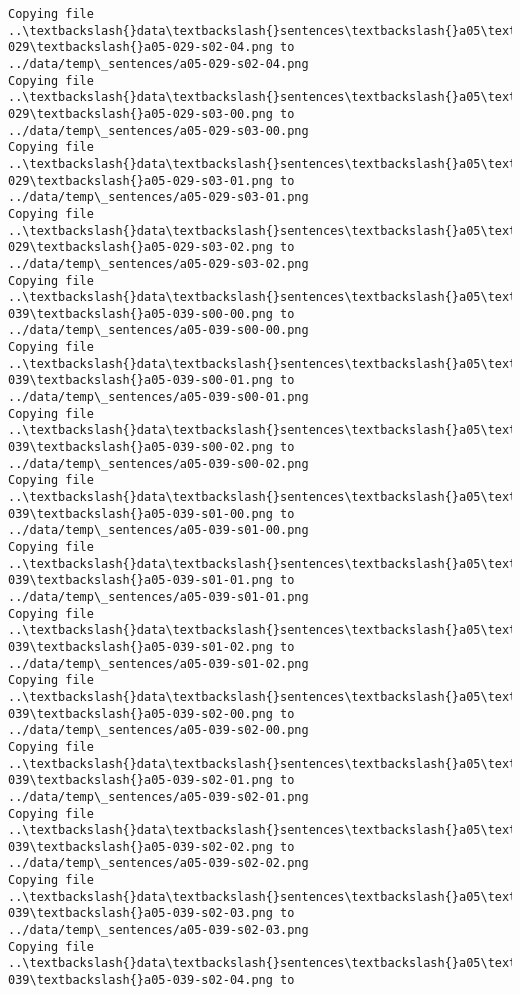\documentclass[11pt]{article}
\begin{document}
\begin{Verbatim}[commandchars=\\\{\}]
Copying file ..\textbackslash{}data\textbackslash{}sentences\textbackslash{}a05\textbackslash{}a05-029\textbackslash{}a05-029-s02-04.png to
../data/temp\_sentences/a05-029-s02-04.png
Copying file ..\textbackslash{}data\textbackslash{}sentences\textbackslash{}a05\textbackslash{}a05-029\textbackslash{}a05-029-s03-00.png to
../data/temp\_sentences/a05-029-s03-00.png
Copying file ..\textbackslash{}data\textbackslash{}sentences\textbackslash{}a05\textbackslash{}a05-029\textbackslash{}a05-029-s03-01.png to
../data/temp\_sentences/a05-029-s03-01.png
Copying file ..\textbackslash{}data\textbackslash{}sentences\textbackslash{}a05\textbackslash{}a05-029\textbackslash{}a05-029-s03-02.png to
../data/temp\_sentences/a05-029-s03-02.png
Copying file ..\textbackslash{}data\textbackslash{}sentences\textbackslash{}a05\textbackslash{}a05-039\textbackslash{}a05-039-s00-00.png to
../data/temp\_sentences/a05-039-s00-00.png
Copying file ..\textbackslash{}data\textbackslash{}sentences\textbackslash{}a05\textbackslash{}a05-039\textbackslash{}a05-039-s00-01.png to
../data/temp\_sentences/a05-039-s00-01.png
Copying file ..\textbackslash{}data\textbackslash{}sentences\textbackslash{}a05\textbackslash{}a05-039\textbackslash{}a05-039-s00-02.png to
../data/temp\_sentences/a05-039-s00-02.png
Copying file ..\textbackslash{}data\textbackslash{}sentences\textbackslash{}a05\textbackslash{}a05-039\textbackslash{}a05-039-s01-00.png to
../data/temp\_sentences/a05-039-s01-00.png
Copying file ..\textbackslash{}data\textbackslash{}sentences\textbackslash{}a05\textbackslash{}a05-039\textbackslash{}a05-039-s01-01.png to
../data/temp\_sentences/a05-039-s01-01.png
Copying file ..\textbackslash{}data\textbackslash{}sentences\textbackslash{}a05\textbackslash{}a05-039\textbackslash{}a05-039-s01-02.png to
../data/temp\_sentences/a05-039-s01-02.png
Copying file ..\textbackslash{}data\textbackslash{}sentences\textbackslash{}a05\textbackslash{}a05-039\textbackslash{}a05-039-s02-00.png to
../data/temp\_sentences/a05-039-s02-00.png
Copying file ..\textbackslash{}data\textbackslash{}sentences\textbackslash{}a05\textbackslash{}a05-039\textbackslash{}a05-039-s02-01.png to
../data/temp\_sentences/a05-039-s02-01.png
Copying file ..\textbackslash{}data\textbackslash{}sentences\textbackslash{}a05\textbackslash{}a05-039\textbackslash{}a05-039-s02-02.png to
../data/temp\_sentences/a05-039-s02-02.png
Copying file ..\textbackslash{}data\textbackslash{}sentences\textbackslash{}a05\textbackslash{}a05-039\textbackslash{}a05-039-s02-03.png to
../data/temp\_sentences/a05-039-s02-03.png
Copying file ..\textbackslash{}data\textbackslash{}sentences\textbackslash{}a05\textbackslash{}a05-039\textbackslash{}a05-039-s02-04.png to

\end{Verbatim}
\end{document}
